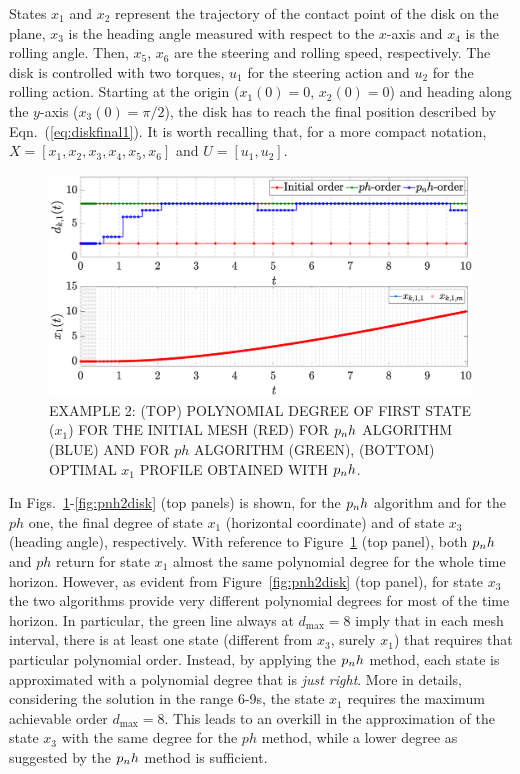 States $x_1$ and $x_2$ represent the trajectory of the contact point of the disk on the plane, $x_3$ is the heading angle measured with respect to
the $x$-axis and $x_4$ is the rolling angle. Then, $x_5$, $x_6$ are the steering and rolling speed, respectively.
The disk is controlled with two torques, $u_1$ for the steering action and $u_2$ for the rolling action. Starting at the origin ($x_1(0) = 0, \, x_2(0) = 0$) and heading along the $y$-axis ($x_3(0) = \pi/2$), the disk has to reach the final position described by
Eqn.~(\ref{eq:diskfinal1}). It is worth recalling that, for a more compact notation, $X = [x_1, x_2, x_3, x_4, x_5, x_6]$  and $U = [u_1, u_2]$.
\begin{figure}[t]
	\centering
	\includegraphics[trim={1cm 0.1cm 2cm 1.05cm},clip,width=1\columnwidth]{Img/pnh1_disk1}
	\caption{EXAMPLE 2: (TOP) POLYNOMIAL DEGREE OF FIRST STATE ($x_{1}$) FOR THE INITIAL MESH (RED) FOR $p_{n}h$ ALGORITHM (BLUE) AND FOR $ph$ ALGORITHM (GREEN), (BOTTOM)
		OPTIMAL $x_1$ PROFILE OBTAINED WITH $p_{n}h$.}
	\label{fig:pnh1disk}
\end{figure}
In Figs.~\ref{fig:pnh1disk}-\ref{fig:pnh2disk} (top panels) is shown, for the $p_{n}h$ algorithm and for the $ph$ one, the final degree of state $x_1$ (horizontal coordinate) and of state $x_3$ (heading angle), respectively.
With reference to Figure~\ref{fig:pnh1disk} (top panel), both $p_{n}h$ and $ph$ return for state $x_1$ almost the same polynomial degree for the whole time horizon. However, as evident from Figure~\ref{fig:pnh2disk} (top panel), for state $x_3$ the two algorithms provide very different polynomial degrees for most of the time horizon.
In particular, the green line always at $d_{\max}=8$ imply that in each mesh interval, there is at least one state (different from $x_3$, surely $x_1$) that requires that particular polynomial order. Instead, by applying the $p_{n}h$ method, each state is approximated with a polynomial degree that is \emph{just right}.
More in details, considering the solution in the range 6-9s, the state $x_1$ requires the maximum achievable order $d_\text{max} = 8$. This leads to an overkill in the approximation of the state $x_3$ with the same degree for the $ph$ method, while a lower degree as suggested by the $p_{n}h$ method is sufficient.

